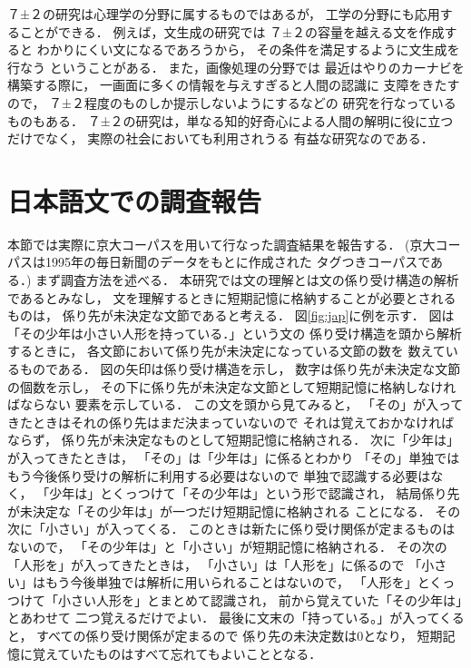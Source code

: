 ７±２の研究は心理学の分野に属するものではあるが，
工学の分野にも応用することができる．
例えば，文生成の研究では
７±２の容量を越える文を作成すると
わかりにくい文になるであろうから\cite{matsuoka96}，
その条件を満足するように文生成を行なう
ということがある\cite{yngve60}．
また，画像処理の分野では
最近はやりのカーナビを構築する際に，
一画面に多くの情報を与えすぎると人間の認識に
支障をきたすので，
７±２程度のものしか提示しないようにするなどの
研究を行なっているものもある\cite{Inui91}．
７±２の研究は，単なる知的好奇心による人間の解明に役に立つだけでなく，
実際の社会においても利用されうる
有益な研究なのである．

\section{日本語文での調査報告}

\begin{figure}[t]
  \begin{center}
  \end{center}
\end{figure}


本節では実際に京大コーパスを用いて行なった調査結果を報告する．
(京大コーパスは1995年の毎日新聞のデータをもとに作成された
タグつきコーパスである．)
まず調査方法を述べる．
本研究では文の理解とは文の係り受け構造の解析であるとみなし，
文を理解するときに短期記憶に格納することが必要とされるものは，
係り先が未決定な文節であると考える．
図\ref{fig:jap}に例を示す．
図は「その少年は小さい人形を持っている．」という文の
係り受け構造を頭から解析するときに，
各文節において係り先が未決定になっている文節の数を
数えているものである．
図の矢印は係り受け構造を示し，
数字は係り先が未決定な文節の個数を示し，
その下に係り先が未決定な文節として短期記憶に格納しなければならない
要素を示している．
この文を頭から見てみると，
「その」が入ってきたときはそれの係り先はまだ決まっていないので
それは覚えておかなければならず，
係り先が未決定なものとして短期記憶に格納される．
次に「少年は」が入ってきたときは，
「その」は「少年は」に係るとわかり
「その」単独ではもう今後係り受けの解析に利用する必要はないので
単独で認識する必要はなく，
「少年は」とくっつけて「その少年は」という形で認識され，
結局係り先が未決定な「その少年は」が一つだけ短期記憶に格納される
ことになる．
その次に「小さい」が入ってくる．
このときは新たに係り受け関係が定まるものはないので，
「その少年は」と「小さい」が短期記憶に格納される．
その次の「人形を」が入ってきたときは，
「小さい」は「人形を」に係るので
「小さい」はもう今後単独では解析に用いられることはないので，
「人形を」とくっつけて「小さい人形を」とまとめて認識され，
前から覚えていた「その少年は」とあわせて
二つ覚えるだけでよい．
最後に文末の「持っている。」が入ってくると，
すべての係り受け関係が定まるので
係り先の未決定数は0となり，
短期記憶に覚えていたものはすべて忘れてもよいこととなる．

